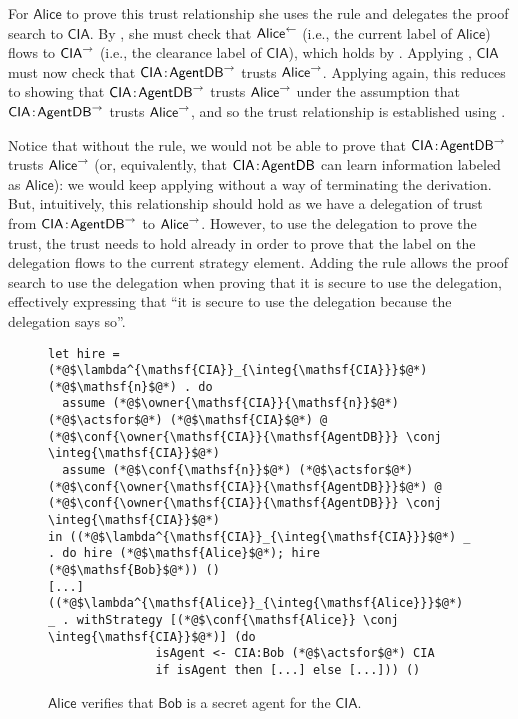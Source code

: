 For $\mathsf{Alice}$ to prove this trust relationship she uses the  rule and delegates the proof search to $\mathsf{CIA}$. By , she must check that $\mathsf{Alice}^{\leftarrow}$ (i.e., the current label of $\mathsf{Alice}$) flows to $\mathsf{CIA}^{\rightarrow}$ (i.e., the clearance label of $\mathsf{CIA}$), which holds by . Applying , $\mathsf{CIA}$ must now check that $\mathsf{CIA}\!:\!\mathsf{AgentDB}^{\rightarrow}$ trusts $\mathsf{Alice}^{\rightarrow}$. Applying  again, this reduces to showing that $\mathsf{CIA}\!:\!\mathsf{AgentDB}^{\rightarrow}$ trusts $\mathsf{Alice}^{\rightarrow}$ under the assumption that $\mathsf{CIA}\!:\!\mathsf{AgentDB}^{\rightarrow}$ trusts $\mathsf{Alice}^{\rightarrow}$, and so the trust relationship is established using .

Notice that without the  rule, we would not be able to prove that $\mathsf{CIA}\!:\!\mathsf{AgentDB}^{\rightarrow}$ trusts $\mathsf{Alice}^{\rightarrow}$ (or, equivalently, that $\mathsf{CIA}\!:\!\mathsf{AgentDB}$ can learn information labeled as $\mathsf{Alice}$): we would keep applying  without a way of terminating the derivation. But, intuitively, this relationship should hold as we have a delegation of trust from $\mathsf{CIA}\!:\!\mathsf{AgentDB}^{\rightarrow}$ to $\mathsf{Alice}^{\rightarrow}$. However, to use the delegation to prove the trust, the trust needs to hold already in order to prove that the label on the delegation flows to the current strategy element. Adding the  rule allows the proof search to use the delegation when proving that it is secure to use the delegation, effectively expressing that ``it is secure to use the delegation because the delegation says so''.

\begin{figure}
\centering
\begin{lstlisting}
let hire = (*@$\lambda^{\mathsf{CIA}}_{\integ{\mathsf{CIA}}}$@*) (*@$\mathsf{n}$@*) . do
  assume (*@$\owner{\mathsf{CIA}}{\mathsf{n}}$@*) (*@$\actsfor$@*) (*@$\mathsf{CIA}$@*) @ (*@$\conf{\owner{\mathsf{CIA}}{\mathsf{AgentDB}}} \conj \integ{\mathsf{CIA}}$@*)
  assume (*@$\conf{\mathsf{n}}$@*) (*@$\actsfor$@*) (*@$\conf{\owner{\mathsf{CIA}}{\mathsf{AgentDB}}}$@*) @ (*@$\conf{\owner{\mathsf{CIA}}{\mathsf{AgentDB}}} \conj \integ{\mathsf{CIA}}$@*)
in ((*@$\lambda^{\mathsf{CIA}}_{\integ{\mathsf{CIA}}}$@*) _ . do hire (*@$\mathsf{Alice}$@*); hire (*@$\mathsf{Bob}$@*)) ()
[...]
((*@$\lambda^{\mathsf{Alice}}_{\integ{\mathsf{Alice}}}$@*) _ . withStrategy [(*@$\conf{\mathsf{Alice}} \conj \integ{\mathsf{CIA}}$@*)] (do
               isAgent <- CIA:Bob (*@$\actsfor$@*) CIA
               if isAgent then [...] else [...])) ()
\end{lstlisting}
\caption{$\mathsf{Alice}$ verifies that $\mathsf{Bob}$ is a secret agent for the $\mathsf{CIA}$.}
\label{fig:govt-alice-checks-bob}
\end{figure}